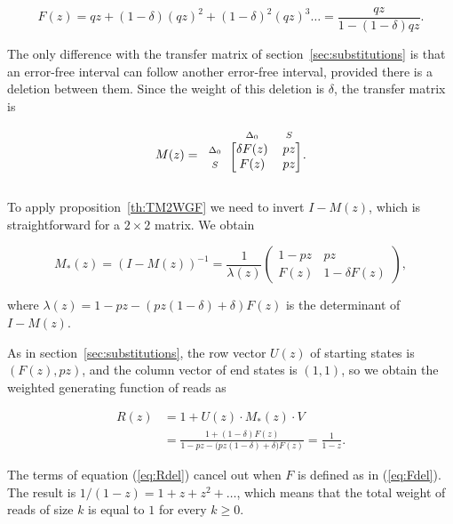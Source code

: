 \documentclass{article}
\newcommand{\smS}{\scriptstyle{S}}
\newcommand{\smDELz}{\scriptstyle{\Delta_0}}
\begin{document}
\begin{equation}
\label{eq:Fdel}
F(z) = qz + (1-\delta)(qz)^2 + (1-\delta)^2(qz)^3 \ldots =
\frac{qz}{1-(1-\delta)qz}.
\end{equation}

The only difference with the transfer matrix of
section~\ref{sec:substitutions} is that an error-free interval can follow
another error-free interval, provided there is a deletion between them.
Since the weight of this deletion is $\delta$, the transfer matrix is


\begin{equation*}
M(z) = 
\begin{blockarray}{ccc}
       & \smDELz & \smS \\
\begin{block}{c[cc]}
\smDELz & \delta F(z) & pz \\
\smS    &        F(z) & pz \\
\end{block}
\end{blockarray}.
\end{equation*}

To apply proposition~\ref{th:TM2WGF} we need to invert $I-M(z)$, which is
straightforward for a $2 \times 2$ matrix. We obtain

\begin{equation*}
M_*(z) = (I-M(z))^{-1}=
\frac{1}{\lambda(z)}
\left(
\begin{matrix}
1-pz  & pz              \\
F(z) & 1 -\delta F(z)
\end{matrix}
\right),
\end{equation*}

\noindent
where $\lambda(z) = 1-pz-(pz(1-\delta)+\delta)F(z)$ is the determinant of
$I-M(z)$.

As in section~\ref{sec:substitutions}, the row vector $U(z)$ of starting
states is $(F(z), pz)$, and the column vector of end states is $(1,1)$, so
we obtain the weighted generating function of reads as

\begin{equation}
\label{eq:Rdel}
\begin{split}
R(z) &= 1 + U(z) \cdot M_*(z) \cdot V \\
&= \frac{1+(1-\delta)F(z)} {1-pz - \big(pz(1-\delta) + \delta\big)F(z)}
= \frac{1}{1-z}.
\end{split}
\end{equation}

The terms of equation (\ref{eq:Rdel}) cancel out when $F$ is defined as in
(\ref{eq:Fdel}). The result is $1/(1-z) = 1+z +z^2 + \ldots$, which means
that the total weight of reads of size $k$ is equal to $1$ for every $k
\geq 0$.
\end{document}

